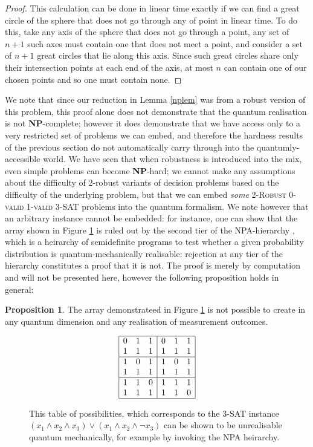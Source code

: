 \documentclass[reprint]{revtex4-1}
\theoremstyle{definition}
\newtheorem{prop}{Proposition}
\begin{document}
\begin{proof}
This calculation can be done in linear time exactly if we can find a great circle of the sphere that does not go through any of point in linear time. To do this, take any axis of the sphere that does not go through a point, any set of $n+1$ such axes must contain one that does not meet a point, and consider a set of $n+1$ great circles that lie along this axis. Since such great circles share only their intersection points at each end of the axis, at most $n$ can contain one of our chosen points and so one must contain none.
\end{proof}
We note that since our reduction in Lemma \ref{nplem} was from a robust version of this problem, this proof alone does not demonstrate that the quantum realisation is not \textbf{NP}-complete; however it does demonstrate that we have access only to a very restricted set of problems we can embed, and therefore the hardness results of the previous section do not automatically carry through into the quantumly-accessible world. We have seen that when robustness is introduced into the mix, even simple problems can become \textbf{NP}-hard; we cannot make any assumptions about the difficulty of 2-robust variants of decision problems based on the difficulty of the underlying problem, but that we can embed \emph{some} \textsc{2-Robust 0-valid 1-valid 3-SAT} problems into the quantum formalism. We note however that an arbitrary instance cannot be embedded: for instance, one can show that the array shown in Figure \ref{badarray} is ruled out by the second tier of the NPA-hierarchy \cite{Nava2008}, which is a heirarchy of semidefinite programs to test whether a given probability distribution is quantum-mechanically realisable: rejection at any tier of the hierarchy constitutes a proof that it is not. The proof is merely by computation and will not be presented here, however the following proposition holds in general:

\begin{prop}The array demonstrateed in Figure \ref{badarray} is not possible to create in any quantum dimension and any realisation of measurement outcomes.
\end{prop}
\begin{figure}
\begin{equation*} 
\begin{array}{  | c c  c| c c c|}
\hline
 0 & 1 & 1 & 0 & 1 & 1 \\
 1 & 1& 1& 1 & 1& 1 \\ \hline
 1 &0 & 1 & 1 &0 & 1 \\
 1 & 1& 1 & 1 & 1& 1  \\ \hline
 1 & 1 & 0&  1 & 1 & 1\\
 1 & 1& 1 &1 & 1 & 0 \\ \hline
 \end{array}
 \end{equation*} 
\caption{This table of possibilities, which corresponds to the \textsc{3-SAT} instance $(x_1\wedge x_2 \wedge x_3)\vee (x_1\wedge x_2 \wedge \neg x_3)$ can be shown to be unrealisable quantum mechanically, for example by invoking the NPA heirarchy.}
\label{badarray}
\end{figure}
 
\end{document}
